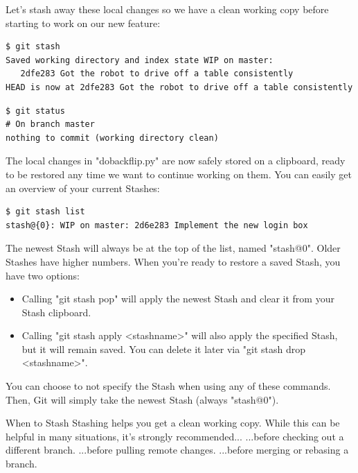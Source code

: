 \documentclass{article}
\begin{document}
Let's stash away these local changes so we have a clean working copy before starting to work on our new feature:

\begin{lstlisting}
$ git stash
Saved working directory and index state WIP on master: 
   2dfe283 Got the robot to drive off a table consistently
HEAD is now at 2dfe283 Got the robot to drive off a table consistently
\end{lstlisting}
\begin{lstlisting}
$ git status
# On branch master
nothing to commit (working directory clean)
\end{lstlisting}
The local changes in "dobackflip.py" are now safely stored on a clipboard, ready to be restored any time we want to continue working on them.
\newline\newline
You can easily get an overview of your current Stashes:
\begin{lstlisting}
$ git stash list
stash@{0}: WIP on master: 2d6e283 Implement the new login box
\end{lstlisting}

The newest Stash will always be at the top of the list, named "stash@{0}". Older Stashes have higher numbers.
\newline\newline
When you're ready to restore a saved Stash, you have two options:
\begin{itemize}
    \item Calling "git stash pop" will apply the newest Stash and clear it from your Stash clipboard.
    \item Calling "git stash apply <stashname>" will also apply the specified Stash, but it will remain saved. You can delete it later via "git stash drop <stashname>".
\end{itemize}

You can choose to not specify the Stash when using any of these commands. Then, Git will simply take the newest Stash (always "stash@{0}").

\begin{concept}
When to Stash
\newline\newline
Stashing helps you get a clean working copy. While this can be helpful in many situations, it's strongly recommended...
\newline\newline
...before checking out a different branch.
\newline
...before pulling remote changes.
\newline
...before merging or rebasing a branch.
\end{concept}
\end{document}
